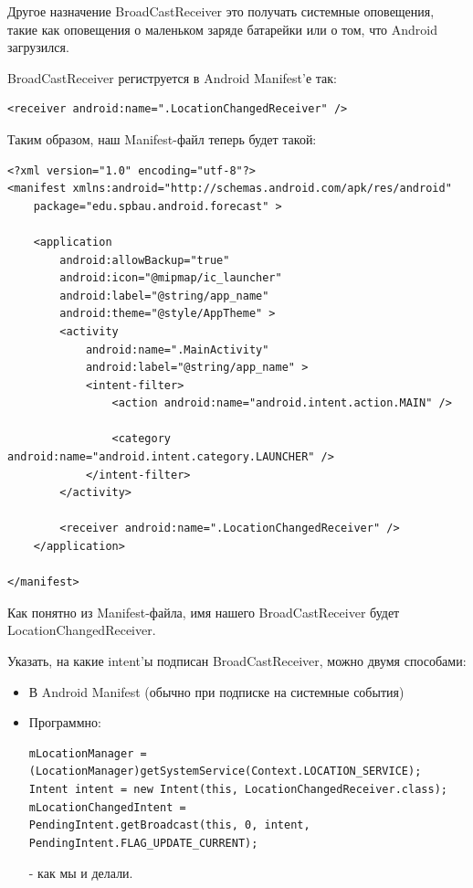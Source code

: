 \documentclass[12 pt]{article}
\begin{document}
    Другое назначение BroadCastReceiver это получать системные оповещения, такие как оповещения о маленьком заряде батарейки или о том, что Android загрузился.
    
    BroadCastReceiver региструется в Android Manifest'е так:
    \begin{lstlisting}
<receiver android:name=".LocationChangedReceiver" />
    \end{lstlisting} 
    
    Таким образом, наш Manifest-файл теперь будет такой:
    
    \begin{lstlisting}
<?xml version="1.0" encoding="utf-8"?>
<manifest xmlns:android="http://schemas.android.com/apk/res/android"
    package="edu.spbau.android.forecast" >

    <application
        android:allowBackup="true"
        android:icon="@mipmap/ic_launcher"
        android:label="@string/app_name"
        android:theme="@style/AppTheme" >
        <activity
            android:name=".MainActivity"
            android:label="@string/app_name" >
            <intent-filter>
                <action android:name="android.intent.action.MAIN" />

                <category android:name="android.intent.category.LAUNCHER" />
            </intent-filter>
        </activity>

        <receiver android:name=".LocationChangedReceiver" />
    </application>

</manifest>   
    \end{lstlisting}
    
    Как понятно из Manifest-файла, имя нашего BroadCastReceiver будет LocationChangedReceiver.
        
    Указать, на какие intent'ы подписан BroadCastReceiver, можно двумя способами:
	\begin{itemize}
    	\item В Android Manifest (обычно при подписке на системные события)
		\item Программно:
        \begin{lstlisting}
mLocationManager = (LocationManager)getSystemService(Context.LOCATION_SERVICE);
Intent intent = new Intent(this, LocationChangedReceiver.class);
mLocationChangedIntent =
PendingIntent.getBroadcast(this, 0, intent, PendingIntent.FLAG_UPDATE_CURRENT);
    \end{lstlisting} - как мы и делали.
    \end{itemize}
\end{document}
